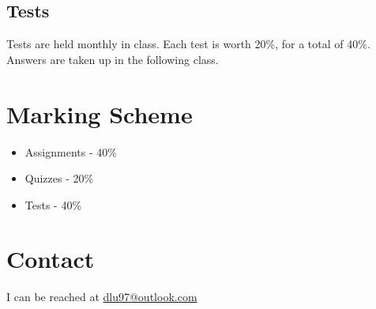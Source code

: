 \documentclass{article}
\begin{document}
	\subsection{Tests}
	Tests are held monthly in class. Each test is worth 20\%, for a total of 40\%. Answers are taken up in the following class.
	
	\section{Marking Scheme}
	
	\begin{itemize}
		\item{Assignments - 40\%}
		\item{Quizzes - 20\%}
		\item{Tests - 40\%}
	\end{itemize}
	
	\section{Contact}
	
	I can be reached at \href{mailto:dlu97@outlook.com}{dlu97@outlook.com}
	
\end{document}
